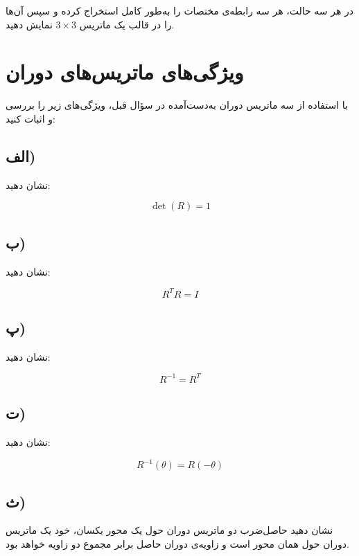 \documentclass[a4paper,16pt]{article}
\begin{document}
	در هر سه حالت، هر سه رابطه‌ی مختصات را به‌طور کامل استخراج کرده و سپس آن‌ها را در قالب یک ماتریس $3\times3$ نمایش دهید.
	
	
	
	\section{ویژگی‌های ماتریس‌های دوران}
	
	با استفاده از سه ماتریس دوران به‌دست‌آمده در سؤال قبل، ویژگی‌های زیر را بررسی و اثبات کنید:
	
	\subsection*{الف)}
	
	نشان دهید:
	
	\[
	\det(R)=1
	\]
	
	\subsection*{ب)}
	
	نشان دهید:
	
	\[
	R^TR=I
	\]
	
	\subsection*{پ)}
	
	نشان دهید:
	
	\[
	R^{-1}=R^T
	\]
	
	\subsection*{ت)}
	
	نشان دهید:
	
	\[
	R^{-1}(\theta)=R(-\theta)
	\]
	
	\subsection*{ث)}
	
	نشان دهید حاصل‌ضرب دو ماتریس دوران حول یک محور یکسان، خود یک ماتریس دوران حول همان محور است و زاویه‌ی دوران حاصل برابر مجموع دو زاویه خواهد بود.
	
	
	
\end{document}
